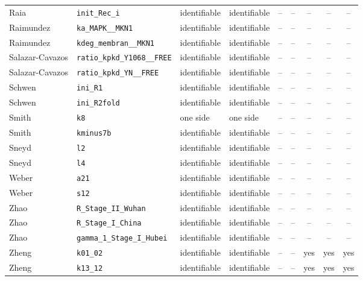 \begin{longtable}{@{}llllccccc@{}}
Raia & \texttt{init\_Rec\_i} & identifiable & identifiable & -- & -- & -- & -- & -- \\
Raimundez & \texttt{ka\_MAPK\_\_MKN1} & identifiable & identifiable & -- & -- & -- & -- & -- \\
Raimundez & \texttt{kdeg\_membran\_\_MKN1} & identifiable & identifiable & -- & -- & -- & -- & -- \\
Salazar-Cavazos & \texttt{ratio\_kpkd\_Y1068\_\_FREE} & identifiable & identifiable & -- & -- & -- & -- & -- \\
Salazar-Cavazos & \texttt{ratio\_kpkd\_YN\_\_FREE} & identifiable & identifiable & -- & -- & -- & -- & -- \\
Schwen & \texttt{ini\_R1} & identifiable & identifiable & -- & -- & -- & -- & -- \\
Schwen & \texttt{ini\_R2fold} & identifiable & identifiable & -- & -- & -- & -- & -- \\
Smith & \texttt{k8} & one side & one side & -- & -- & -- & -- & -- \\
Smith & \texttt{kminus7b} & identifiable & identifiable & -- & -- & -- & -- & -- \\
Sneyd & \texttt{l2} & identifiable & identifiable & -- & -- & -- & -- & -- \\
Sneyd & \texttt{l4} & identifiable & identifiable & -- & -- & -- & -- & -- \\
Weber & \texttt{a21} & identifiable & identifiable & -- & -- & -- & -- & -- \\
Weber & \texttt{s12} & identifiable & identifiable & -- & -- & -- & -- & -- \\
Zhao & \texttt{R\_Stage\_II\_Wuhan} & identifiable & identifiable & -- & -- & -- & -- & -- \\
Zhao & \texttt{R\_Stage\_I\_China} & identifiable & identifiable & -- & -- & -- & -- & -- \\
Zhao & \texttt{gamma\_1\_Stage\_I\_Hubei} & identifiable & identifiable & -- & -- & -- & -- & -- \\
Zheng & \texttt{k01\_02} & identifiable & identifiable & -- & -- & yes & yes & yes \\
Zheng & \texttt{k13\_12} & identifiable & identifiable & -- & -- & yes & yes & yes \\
\bottomrule
\end{longtable}
\endgroup
